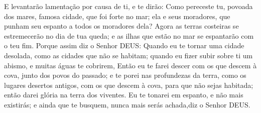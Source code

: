 {E levantarão lamentação por causa de ti, e te dirão: Como pereceste tu, povoada dos mares, famosa cidade, que foi forte no mar; ela e seus moradores, que punham seu espanto a todos os moradores dela?
Agora as terras costeiras se estremecerão no dia de tua queda; e as ilhas que estão no mar se espantarão com o teu fim.
Porque assim diz o Senhor DEUS: Quando eu te tornar uma cidade desolada, como as cidades que não se habitam; quando eu fizer subir sobre ti um abismo, e muitas águas te cobrirem,
Então eu te farei descer com os que descem à cova, junto dos povos do passado; e te porei nas profundezas da terra, como os lugares desertos antigos, com os que descem à cova, para que não sejas habitada; então darei glória
 na terra dos viventes.
Eu te tonarei em espanto, e não mais existirás; e ainda que te busquem, nunca mais serás achada,diz o Senhor DEUS.

}
